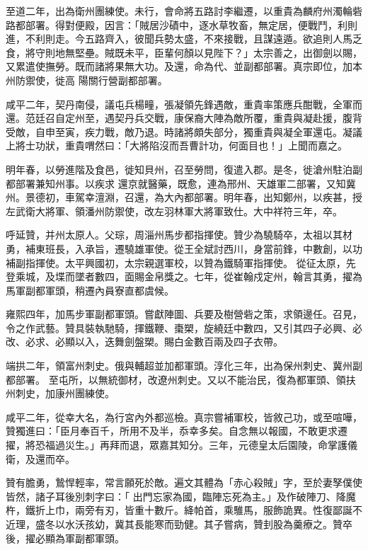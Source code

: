 \begin{pinyinscope}
 至道二年，出為衛州團練使。未行，會命將五路討李繼遷，以重貴為麟府州濁輪砦路都部署。得對便殿，因言：「賊居沙磧中，逐水草牧畜，無定居，便戰鬥，利則進，不利則走。今五路齊入，彼聞兵勢太盛，不來接戰，且謀遠遁。欲追則人馬乏食，將守則地無堅壘。賊既未平，臣輩何顏以見陛下？」太宗善之，出御劍以賜，又累遣使撫勞。既而諸將果無大功。及還，命為代、並副都部署。真宗即位，加本州防禦使，徙高
 陽關行營副都部署。



 咸平二年，契丹南侵，議屯兵楊疃，張凝領先鋒遇敵，重貴率策應兵酣戰，全軍而還。范廷召自定州至，遇契丹兵交戰，康保裔大陣為敵所覆，重貴與凝赴援，腹背受敵，自申至寅，疾力戰，敵乃退。時諸將頗失部分，獨重貴與凝全軍還屯。凝議上將士功狀，重貴喟然曰：「大將陷沒而吾曹計功，何面目也！」上聞而嘉之。



 明年春，以勞進階及食邑，徙知貝州，召至勞問，復遣入郡。是冬，徙滄州駐泊副都部署兼知州事。以疾求
 還京就醫藥，既愈，連為邢州、天雄軍二部署，又知冀州。景德初，車駕幸澶淵，召還，為大內都部署。明年春，出知鄭州，以疾甚，授左武衛大將軍、領潘州防禦使，改左羽林軍大將軍致仕。大中祥符三年，卒。



 呼延贊，并州太原人。父琮，周淄州馬步都指揮使。贊少為驍騎卒，太祖以其材勇，補東班長，入承旨，遷驍雄軍使。從王全斌討西川，身當前鋒，中數創，以功補副指揮使。太平興國初，太宗親選軍校，以贊為鐵騎軍指揮使。
 從征太原，先登乘城，及堞而墜者數四，面賜金帛獎之。七年，從崔翰戍定州，翰言其勇，擢為馬軍副都軍頭，稍遷內員寮直都虞候。



 雍熙四年，加馬步軍副都軍頭。嘗獻陣圖、兵要及樹營砦之策，求領邊任。召見，令之作武藝。贊具裝執馳騎，揮鐵鞭、棗槊，旋繞廷中數四，又引其四子必興、必改、必求、必顯以入，迭舞劍盤槊。賜白金數百兩及四子衣帶。



 端拱二年，領富州刺史。俄與輔超並加都軍頭。淳化三年，出為保州刺史、冀州副都部署。
 至屯所，以無統御材，改遼州刺史。又以不能治民，復為都軍頭、領扶州刺史，加康州團練使。



 咸平二年，從幸大名，為行宮內外都巡檢。真宗嘗補軍校，皆敘己功，或至喧嘩，贊獨進曰：「臣月奉百千，所用不及半，忝幸多矣。自念無以報國，不敢更求遷擢，將恐福過災生。」再拜而退，眾嘉其知分。三年，元德皇太后園陵，命掌護儀衛，及還而卒。



 贊有膽勇，鷙悍輕率，常言願死於敵。遍文其體為「赤心殺賊」字，至於妻孥僕使皆然，諸子耳後別刺字曰：「
 出門忘家為國，臨陣忘死為主。」及作破陣刀、降魔杵，鐵折上巾，兩旁有刃，皆重十數斤。絳帕首，乘騅馬，服飾詭異。性復鄙誕不近理，盛冬以水沃孩幼，冀其長能寒而勁健。其子嘗病，贊刲股為羹療之。贊卒後，擢必顯為軍副都軍頭。




\end{pinyinscope}
